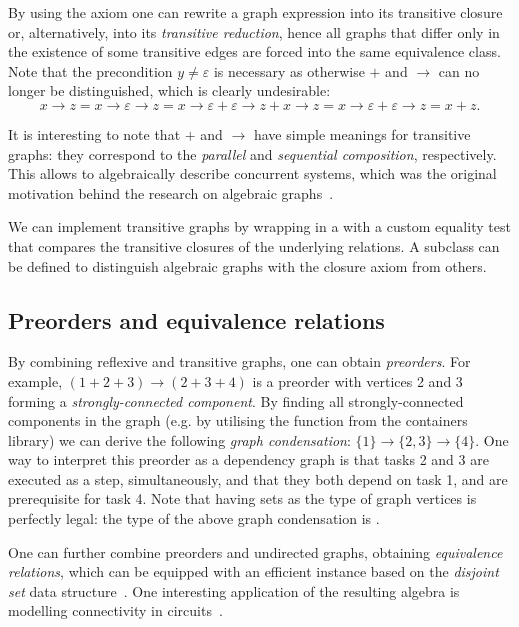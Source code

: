 By using the axiom one can rewrite a graph expression into its transitive closure or,
alternatively, into its \emph{transitive reduction}, hence all graphs that differ only in the
existence of some transitive edges are forced into the same equivalence class. Note that the
precondition $y \neq \varepsilon$ is necessary as otherwise $+$ and $\rightarrow$ can no
longer be distinguished, which is clearly undesirable:
\[
x\!\rightarrow\!z = x\!\rightarrow\!\varepsilon\!\rightarrow z = x\!\rightarrow\!\varepsilon
 + \varepsilon\!\rightarrow\!z + x\!\rightarrow\!z = x\!\rightarrow\!\varepsilon
 + \varepsilon\!\rightarrow\!z = x + z.
\]

It is interesting to note that $+$ and $\rightarrow$ have simple meanings for transitive
graphs: they correspond to the \emph{parallel} and \emph{sequential composition},
respectively. This allows to algebraically describe concurrent systems, which was
the original motivation behind the research on algebraic graphs~\cite{2014_algebra_mokhov}.

We can implement transitive graphs by wrapping
 in a  with a custom equality test that
compares the transitive closures of the underlying relations.
A subclass  can be
defined to distinguish algebraic graphs with the closure axiom from others.

\subsection{Preorders and equivalence relations}\label{sub-preorder}

By combining reflexive and transitive graphs, one can obtain \emph{preorders}.
For example, $(1 + 2 + 3) \rightarrow (2 + 3 + 4)$
is a preorder with vertices 2 and 3 forming a \emph{strongly-connected component}. By
finding all strongly-connected components in the graph (e.g. by utilising the
function  from the \textsf{containers} library) we can derive the
following \emph{graph condensation}:
$\{1\} \rightarrow \{2, 3\} \rightarrow \{4\}$. One way to interpret this preorder as a
dependency graph is that tasks 2 and 3 are executed as a step, simultaneously,
and that they both depend on task 1, and are prerequisite for task 4. Note that
having sets as the type of graph vertices is perfectly legal: the type of the
above graph condensation is .

One can further combine preorders and undirected graphs, obtaining \emph{equivalence
relations}, which can be equipped with an efficient instance based on the
\emph{disjoint set} data structure~\cite{1984_set_union_tarjan}. One interesting
application of the resulting algebra is modelling connectivity in
circuits~\cite{2015_mokhov_algebra}.

